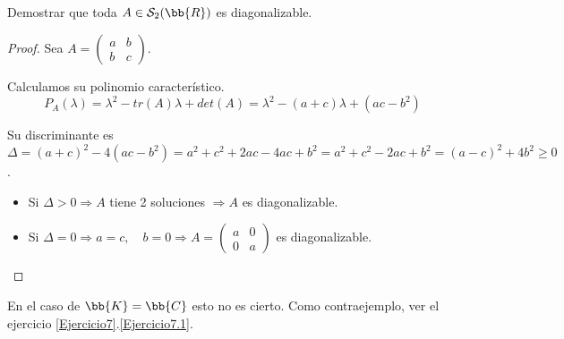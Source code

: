 \begin{ejercicio}
    Demostrar que toda $A\in \mathcal{S}_2(\bb{R})$ es diagonalizable.
    \begin{proof}
        Sea $ A=\left(\begin{array}{cc}
            a & b \\
            b & c
        \end{array}\right)$.
    
        Calculamos su polinomio característico.
        \begin{equation*}
            P_A(\lambda) = \lambda^2 - tr(A)\lambda + det(A) = \lambda^2-(a+c)\lambda + (ac-b^2)
        \end{equation*}
    
        Su discriminante es $\Delta=(a+c)^2-4(ac-b^2) = a^2+c^2+2ac-4ac+b^2 = a^2+c^2-2ac+b^2 = (a-c)^2+4b^2 \geq 0$.
        \begin{itemize}
            \item Si $\Delta > 0 \Longrightarrow A$ tiene 2 soluciones $\Longrightarrow A$ es diagonalizable.
    
            \item Si $\Delta = 0 \Longrightarrow a=c,\quad b=0 \Longrightarrow A=\left(\begin{array}{cc}
            a & 0 \\
            0 & a
        \end{array}\right)$ es diagonalizable. 
        \end{itemize}
    \end{proof}
\end{ejercicio}

\begin{observacion} En el caso de $\bb{K}=\bb{C}$ esto no es cierto. Como contraejemplo, ver el ejercicio \ref{Ejercicio7}.\ref{Ejercicio7.1}.
\end{observacion}


